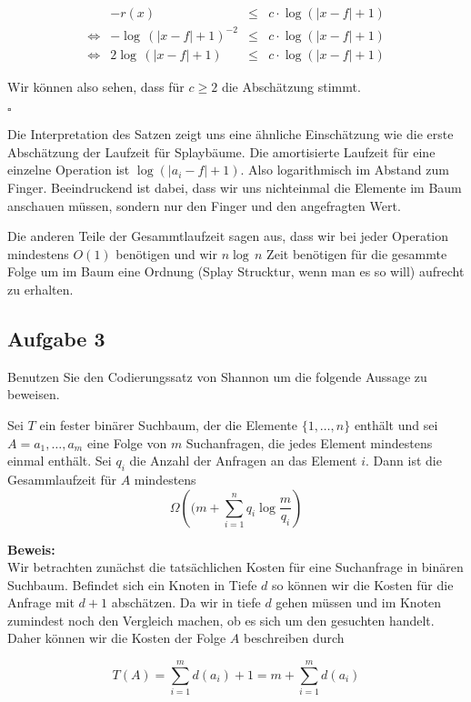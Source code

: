 \documentclass[11pt,a4paper,ngerman]{article}
\begin{document}
{$$\begin{array}{crcl}
	&  - r(x) &\leq& c \cdot \log (|x - f| + 1)\\ 
\Leftrightarrow & - \log \, (|x - f| + 1)^{-2} & \leq & c \cdot \log (|x - f|+ 1)\\
\Leftrightarrow & 2 \log \, (|x - f| + 1) & \leq & c \cdot \log (|x - f| + 1)
\end{array}$$

Wir können also sehen, dass für $c \geq 2$ die Abschätzung stimmt.

\mbox{}\hfill$\square$

Die Interpretation des Satzen zeigt uns eine ähnliche Einschätzung wie die erste Abschätzung der Laufzeit für Splaybäume. 
Die amortisierte Laufzeit für eine einzelne Operation ist $\log (|a_i - f| + 1)$. Also logarithmisch im Abstand zum Finger. Beeindruckend ist dabei,
dass wir uns nichteinmal die Elemente im Baum anschauen müssen, sondern nur den Finger und den angefragten Wert.

Die anderen Teile der Gesammtlaufzeit sagen aus, dass wir bei jeder Operation mindestens $O(1)$ benötigen und wir $n \log \, n$ Zeit
benötigen für die gesammte Folge um im Baum eine Ordnung (Splay Strucktur, wenn man es so will) aufrecht zu erhalten.

\subsection*{Aufgabe 3}
Benutzen Sie den Codierungssatz von Shannon um die folgende Aussage zu beweisen.

Sei $T$ ein fester binärer Suchbaum, der die Elemente $\{1,\ldots,n\}$ enthält und sei $A=a_1,\ldots,a_m$ eine Folge von $m$ Suchanfragen, die jedes Element mindestens einmal enthält. Sei $q_i$ die Anzahl der Anfragen an das Element $i$. Dann ist die Gesammlaufzeit für $A$ mindestens
$$
   \Omega\left((m + \sum_{i=1}^n q_i \log \frac{m}{q_i}\right)
$$

\noindent\textbf{Beweis:}\\

Wir betrachten zunächst die tatsächlichen Kosten für eine Suchanfrage in binären Suchbaum. Befindet sich ein Knoten in Tiefe $d$ so können wir
die Kosten für die Anfrage mit $d+1$ abschätzen. Da wir in tiefe $d$ gehen müssen und im Knoten zumindest noch den Vergleich machen, ob es sich um den gesuchten handelt. Daher können wir die Kosten der Folge $A$ beschreiben durch

$$
	T(A) = \sum_{i=1}^m d(a_i) + 1 = m + \sum_{i=1}^m d(a_i)
$$

}
\end{document}
